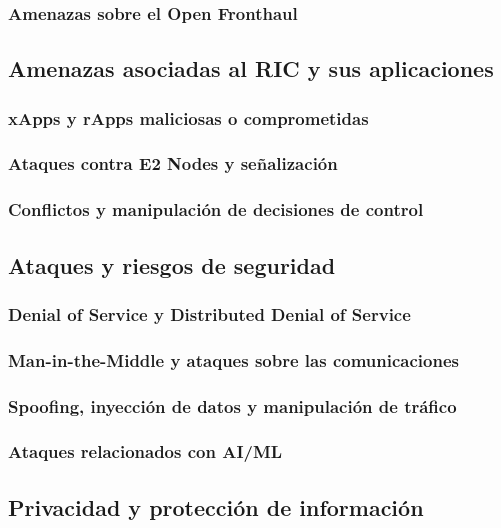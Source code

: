 \documentclass[11pt,a4paper]{article}
\makeatletter
\let\ORIGsubsection\subsection
\def\subsection{\@nobreakfalse\ORIGsubsection}
\let\ORIGsubsubsection\subsubsection
\def\subsubsection{\@nobreakfalse\ORIGsubsubsection}
\makeatother
\begin{document}
\subsubsection{Amenazas sobre el Open Fronthaul}

\subsection{Amenazas asociadas al RIC y sus aplicaciones}

\subsubsection{xApps y rApps maliciosas o comprometidas}
\subsubsection{Ataques contra E2 Nodes y señalización}
\subsubsection{Conflictos y manipulación de decisiones de control}

\subsection{Ataques y riesgos de seguridad}

\subsubsection{Denial of Service y Distributed Denial of Service}
\subsubsection{Man-in-the-Middle y ataques sobre las comunicaciones}
\subsubsection{Spoofing, inyección de datos y manipulación de tráfico}
\subsubsection{Ataques relacionados con AI/ML}

\subsection{Privacidad y protección de información}
\end{document}

